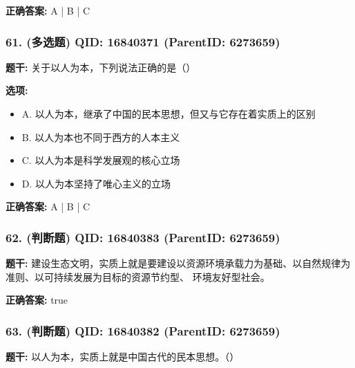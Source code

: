 \documentclass[12pt,UTF8]{ctexart}
\begin{document}
\textbf{正确答案:}
A | B | C

\vspace{0.3em}\hrulefill\vspace{0.7em}

\subsubsection*{61. (多选题) \small QID: 16840371 (ParentID: 6273659)}

\textbf{题干:}
关于以人为本，下列说法正确的是（）



\textbf{选项:}
\begin{itemize}[leftmargin=*]

  \item A. 以人为本，继承了中国的民本思想，但又与它存在着实质上的区别

  \item B. 以人为本也不同于西方的人本主义

  \item C. 以人为本是科学发展观的核心立场

  \item D. 以人为本坚持了唯心主义的立场

\end{itemize}

\textbf{正确答案:}
A | B | C

\vspace{0.3em}\hrulefill\vspace{0.7em}

\subsubsection*{62. (判断题) \small QID: 16840383 (ParentID: 6273659)}

\textbf{题干:}
建设生态文明，实质上就是要建设以资源环境承载力为基础、以自然规律为准则、以可持续发展为目标的资源节约型、 环境友好型社会。



\textbf{正确答案:}
true

\vspace{0.3em}\hrulefill\vspace{0.7em}

\subsubsection*{63. (判断题) \small QID: 16840382 (ParentID: 6273659)}

\textbf{题干:}
以人为本，实质上就是中国古代的民本思想。（）
\end{document}
